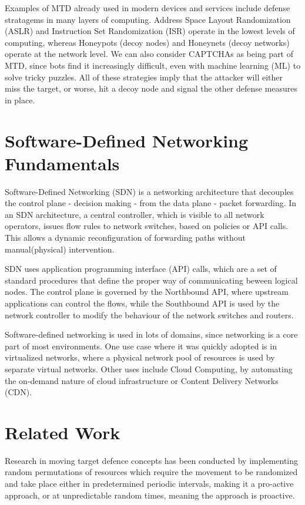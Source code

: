 Examples of MTD already used in modern devices and services include defense stratagems in many layers of computing. Address Space Layout Randomization (ASLR)\cite{shacham2004} and Instruction Set Randomization (ISR)\cite{kc2003} operate in the lowest levels of computing, whereas Honeypots (decoy nodes) and Honeynets (decoy networks) operate at the network level. We can also consider CAPTCHAs as being part of MTD, since bots find it increasingly difficult, even with machine learning (ML) to solve tricky puzzles. All of these strategies imply that the attacker will either miss the target, or worse, hit a decoy node and signal the other defense measures in place.

\section{Software-Defined Networking Fundamentals}

Software-Defined Networking (SDN) is a networking architecture that decouples the control plane - decision making - from the data plane - packet forwarding\cite{feamster2017}. In an SDN architecture, a central controller, which is visible to all network operators, issues flow rules to network switches, based on policies or API calls. This allows a dynamic reconfiguration of forwarding paths without manual(physical) intervention.

SDN uses application programming interface (API) calls, which are a set of standard procedures that define the proper way of communicating beween logical nodes. The control plane is governed by the Northbound API, where upstream applications can control the flows, while the Southbound API is used by the network controller to modify the behaviour of the network switches and routers.

Software-defined networking is used in lots of domains, since networking is a core part of most environments. One use case where it was quickly adopted is in virtualized networks, where a physical network pool of resources is used by separate virtual networks. Other uses include Cloud Computing, by automating the on-demand nature of cloud infrastructure or Content Delivery Networks (CDN).

\section{Related Work}
Research in moving target defence concepts has been conducted by implementing random permutations of resources \cite{al_shaer2013}\cite{jafarian2012}\cite{mtd_vol1} which require the movement to be randomized and take place either in predetermined periodic intervals, making it a pro-active approach, or at unpredictable random times, meaning the approach is proactive.

